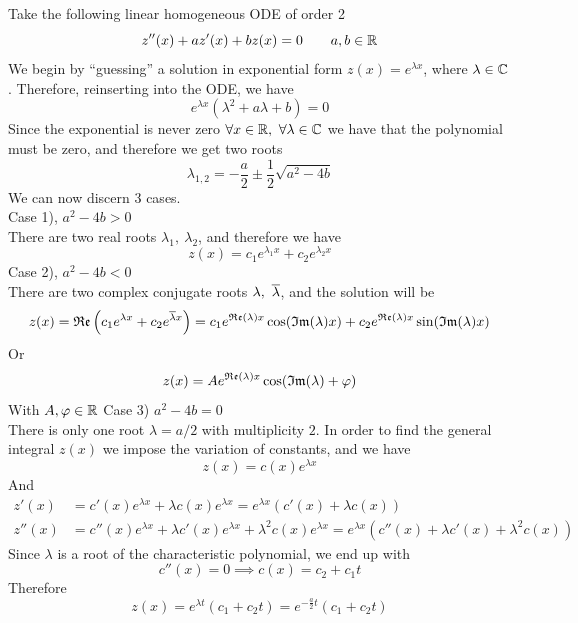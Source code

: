 \documentclass[../complete.tex]{subfiles}
\begin{document}
\begin{mtd}
	Take the following linear homogeneous ODE of order 2
	\begin{equation*}
		z''(x)+az'(x)+bz(x)=0\qquad a,b\in\mathbb{R}
	\end{equation*}
	We begin by ``guessing'' a solution in exponential form $z(x)=e^{\lambda x}$, where $\lambda\in\mathbb{C}$. Therefore, reinserting into the ODE, we have
	\begin{equation*}
		e^{\lambda x}\left( \lambda^2+a\lambda+b \right)=0
	\end{equation*}
	Since the exponential is never zero $\forall x\in\mathbb{R},\ \forall\lambda\in\mathbb{C}$ we have that the polynomial must be zero, and therefore we get two roots
	\begin{equation*}
		\lambda_{1,2}=-\frac{a}{2}\pm\frac{1}{2}\sqrt{a^2-4b}
	\end{equation*}
	We can now discern 3 cases.\\
	Case 1), $a^2-4b>0$\\
	There are two real roots $\lambda_1,\ \lambda_2$, and therefore we have
	\begin{equation*}
		z(x)=c_1e^{\lambda_1x}+c_2e^{\lambda_2x}
	\end{equation*}
	Case 2), $a^2-4b<0$\\
	There are two complex conjugate roots $\lambda,\ \overline{\lambda}$, and the solution will be
	\begin{equation*}
		z(x)=\mathfrak{Re}\left( c_1e^{\lambda x}+c_2e^{\overline{\lambda}x} \right)=c_1e^{\mathfrak{Re}(\lambda)x}\cos(\mathfrak{Im}(\lambda)x)+c_2e^{\mathfrak{Re}(\lambda)x}\sin(\mathfrak{Im}(\lambda)x)
	\end{equation*}
	Or
	\begin{equation*}
		z(x)=Ae^{\mathfrak{Re}(\lambda)x}\cos(\mathfrak{Im}(\lambda)+\varphi)
	\end{equation*}
	With $A,\varphi\in\mathbb{R}$
	Case 3) $a^2-4b=0$\\
	There is only one root $\lambda=a/2$ with multiplicity $2$. In order to find the general integral $z(x)$ we impose the variation of constants, and we have
	\begin{equation*}
		z(x)=c(x)e^{\lambda x}
	\end{equation*}
	And
	\begin{equation*}
		\begin{aligned}
			z'(x)&=c'(x)e^{\lambda x}+\lambda c(x)e^{\lambda x}=e^{\lambda x}(c'(x)+\lambda c(x))\\
			z''(x)&=c''(x)e^{\lambda x}+\lambda c'(x)e^{\lambda x}+\lambda^2 c(x)e^{\lambda x}=e^{\lambda x}(c''(x)+\lambda c'(x)+\lambda^2c(x))
		\end{aligned}
	\end{equation*}
	Since $\lambda$ is a root of the characteristic polynomial, we end up with
	\begin{equation*}
		c''(x)=0\implies{} c(x)=c_2+c_1t
	\end{equation*}
	Therefore
	\begin{equation*}
		z(x)=e^{\lambda t}(c_1+c_2t)=e^{-\frac{a}{2}t}(c_1+c_2t)
	\end{equation*}
\end{mtd}
\end{document}

